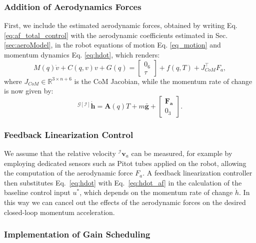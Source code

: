 \subsubsection*{Addition of Aerodynamics Forces}
First, we include the estimated aerodynamic forces, obtained by writing Eq. \eqref{eq:af_total_control} with the aerodynamic coefficients estimated in Sec. \ref{sec:aeroModel}, in the robot equations of motion Eq. \eqref{eq_motion} and momentum dynamics Eq. \eqref{eq:hdot}, which renders:
\begin{equation}
\label{eq_motion_af}
  M(q)\dot{v}+C(q,v)v+G(q)=
  \begin{bmatrix}
    0_6\\
    \tau
  \end{bmatrix}
  +f(q,T)+J_{CoM}^{\top}F_a,
\end{equation}
where $J_{CoM} \in \mathbb{R}^{3 \times n+6}$ is the CoM Jacobian, while the momentum rate of change is now given by:
\begin{equation}
\label{eq:hdot_af}
   {}^{\mathcal{G}[\mathcal{I}]}\dot{\boldsymbol{h}}=\boldsymbol{A}(q)T+m\bar{\boldsymbol{g}}+
   \begin{bmatrix}
   \boldsymbol{F_a}\\
   0_3
   \end{bmatrix}.
\end{equation}

\subsubsection*{Feedback Linearization Control}

We assume that the relative velocity ${}^{\mathcal{I}}\boldsymbol{v}_a$ can be measured, for example by employing dedicated sensors such as Pitot tubes applied on the robot, allowing the computation of the aerodynamic force $F_a$. A feedback linearization controller then substitutes Eq.~\eqref{eq:hdot} with Eq.~\eqref{eq:hdot_af} in the calculation of the baseline control input $u^*$, which depends on the momentum rate of change $\dot{h}$. In this way we can cancel out the effects of the aerodynamic forces on the desired closed-loop momentum acceleration.

\subsubsection*{Implementation of Gain Scheduling}

